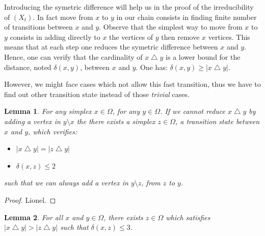 \documentclass[11pt]{article}
\newtheorem{lemma}{Lemma}[subsection]
\begin{document}
Introducing the symetric difference will help us in the proof of the irreducibility of $(X_t)$. In fact move from $x$ to $y$ in our chain consists in finding finite number of transitions between $x$ and $y$. Observe that the simplest way to move from $x$ to $y$ consists in adding directly to $x$ the vertices of $y$ then remove $x$ vertices. This means that at each step one reduces the symetric difference between $x$ and $y$. Hence, one can verify that the cardinality of $x \bigtriangleup y$ is a lower bound for the distance, noted $\delta(x,y)$, between $x$ and $y$. One has: $\delta(x,y) \geq{|x \bigtriangleup y|}$.

However, we might face cases which not allow this fast transition, thus we have to find out other transition state instead of those \textit{trivial} cases.

\begin{lemma}\label{lem:elim-mauvais-cas}
  For any simplex $x \in \Omega$, for any $y \in \Omega$. If we cannot reduce $x \bigtriangleup y$ by adding a vertex in $y \setminus x$ the there exists a simplex $z \in \Omega$, a transition state between $x$ and $y$, which verifies:
  \begin{itemize}
    \item $|x \bigtriangleup y| = |z \bigtriangleup y|$
    \item $\delta(x,z)\leq{2}$
  \end{itemize}
  such that we can always add a vertex in $y \setminus z$, from $z$ to $y$.
\end{lemma}

\begin{proof}
  Lionel.
\end{proof}

\begin{lemma}\label{lem:irreducibility}
  For all $x$ and $y \in \Omega$, there exists $z \in \Omega$ which satisfies $|x \bigtriangleup y| > |z \bigtriangleup y|$ such that $\delta(x,z)\leq{3}$.
\end{lemma}
\end{document}

